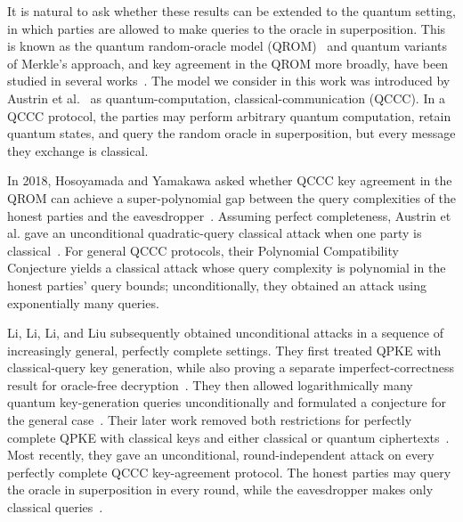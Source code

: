 \documentclass[11pt]{article}
\begin{document}
It is natural to ask whether these results can be extended to the quantum setting, in which parties are allowed to make queries to the oracle in superposition. This is known as the quantum random-oracle model (QROM)~\cite{BonehEtAl11} and quantum variants of Merkle's approach,
and key agreement in the QROM more broadly, have been studied in
several works~\cite{BrassardSalvail08,BrassardEtAl19}. The model we consider in this work was introduced by Austrin
et al.~\cite{AustrinEtAl22} as
quantum-computation, classical-communication (QCCC). In a QCCC
protocol, the parties may perform arbitrary quantum computation, retain
quantum states, and query the random oracle in superposition, but every
message they exchange is classical.

In 2018, Hosoyamada and Yamakawa asked whether QCCC key agreement in the
QROM can achieve a super-polynomial gap between
the query complexities of the honest parties and the
eavesdropper~\cite[Section~6]{HosoyamadaYamakawa18}. Assuming perfect completeness, Austrin et al. gave an unconditional quadratic-query classical attack when one party
is classical~\cite{AustrinEtAl22}. For general QCCC protocols, their Polynomial Compatibility
Conjecture yields a classical attack whose query complexity is polynomial in
the honest parties' query bounds; unconditionally, they obtained an attack using exponentially many queries. 

Li, Li, Li, and Liu subsequently obtained unconditional attacks in a sequence
of increasingly general, perfectly complete settings. They first treated
QPKE with classical-query key generation, while also proving a separate
imperfect-correctness result for oracle-free decryption~\cite{LiEtAl24}.
They then allowed logarithmically many quantum key-generation queries
unconditionally and formulated a conjecture for the general
case~\cite{LiEtAl25}. Their later work removed both restrictions for
perfectly complete QPKE with classical keys and either classical or quantum
ciphertexts~\cite{LiEtAl26PKE}. Most recently, they gave an unconditional,
round-independent attack on every perfectly complete QCCC key-agreement
protocol. The honest parties may query the oracle in superposition in every
round, while the eavesdropper makes only classical
queries~\cite{LiEtAl26ManyRound}.
\end{document}
